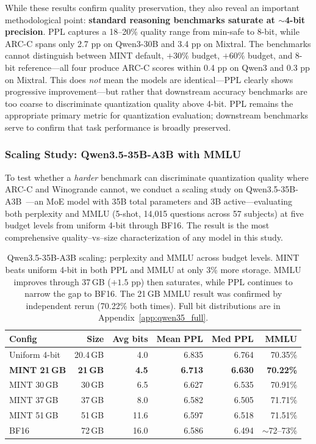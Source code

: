 \documentclass{article}
\begin{document}
While these results confirm quality preservation, they also reveal an important methodological point: \textbf{standard reasoning benchmarks saturate at ${\sim}$4-bit precision}. PPL captures a 18--20\% quality range from min-safe to 8-bit, while ARC-C spans only 2.7 pp on Qwen3-30B and 3.4 pp on Mixtral. The benchmarks cannot distinguish between MINT default, $+30\%$ budget, $+60\%$ budget, and 8-bit reference---all four produce ARC-C scores within 0.4 pp on Qwen3 and 0.3 pp on Mixtral. This does \emph{not} mean the models are identical---PPL clearly shows progressive improvement---but rather that downstream accuracy benchmarks are too coarse to discriminate quantization quality above 4-bit. PPL remains the appropriate primary metric for quantization evaluation; downstream benchmarks serve to confirm that task performance is broadly preserved.

\subsubsection{Scaling Study: Qwen3.5-35B-A3B with MMLU}
\label{sec:qwen35_scaling}

To test whether a \emph{harder} benchmark can discriminate quantization quality where ARC-C and Winogrande cannot, we conduct a scaling study on Qwen3.5-35B-A3B~\cite{qwen3.5}---an MoE model with 35B total parameters and 3B active---evaluating both perplexity and MMLU (5-shot, 14{,}015 questions across 57 subjects) at five budget levels from uniform 4-bit through BF16. The result is the most comprehensive quality--vs--size characterization of any model in this study.

\begin{table}[h]
\centering
\caption{Qwen3.5-35B-A3B scaling: perplexity and MMLU across budget levels. MINT beats uniform 4-bit in both PPL and MMLU at only 3\% more storage. MMLU improves through 37\,GB ($+1.5$ pp) then saturates, while PPL continues to narrow the gap to BF16. The 21\,GB MMLU result was confirmed by independent rerun (70.22\% both times). Full bit distributions are in Appendix~\ref{app:qwen35_full}.}
\label{tab:qwen35_scaling}
\begin{tabular}{lrrrrr}
\toprule
Config & Size & Avg bits & Mean PPL & Med PPL & MMLU \\
\midrule
Uniform 4-bit & 20.4\,GB & 4.0 & 6.835 & 6.764 & 70.35\% \\
\textbf{MINT 21\,GB} & \textbf{21\,GB} & \textbf{4.5} & \textbf{6.713} & \textbf{6.630} & \textbf{70.22\%} \\
MINT 30\,GB & 30\,GB & 6.5 & 6.627 & 6.535 & 70.91\% \\
MINT 37\,GB & 37\,GB & 8.0 & 6.582 & 6.505 & 71.71\% \\
MINT 51\,GB & 51\,GB & 11.6 & 6.597 & 6.518 & 71.51\% \\
BF16 & 72\,GB & 16.0 & 6.586 & 6.494 & ${\sim}$72--73\% \\
\bottomrule
\end{tabular}
\end{table}
\end{document}
